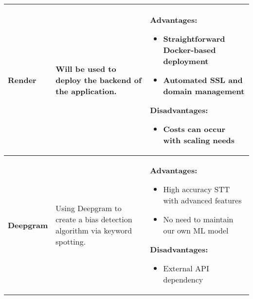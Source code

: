 \documentclass{article}
\begin{document}
\begin{table}[htbp]
\begin{tabularx}{\textwidth}{p{2cm} p{4cm} X}
  \textbf{Render} 
  & Will be used to deploy the backend of the application.
  & \textbf{Advantages:}
    \begin{itemize}
      \item Straightforward Docker-based deployment
      \item Automated SSL and domain management
    \end{itemize}
    \textbf{Disadvantages:}
    \begin{itemize}
      \item Costs can occur with scaling needs
    \end{itemize}
  \\
  \midrule

  \textbf{Deepgram} 
  & Using Deepgram to create a bias detection algorithm via keyword spotting.
  & \textbf{Advantages:}
    \begin{itemize}
      \item High accuracy STT with advanced features
      \item No need to maintain our own ML model
    \end{itemize}
    \textbf{Disadvantages:}
    \begin{itemize}
      \item External API dependency
    \end{itemize}
  \\
  \bottomrule
  \end{tabularx}
\end{table}
\end{document}
